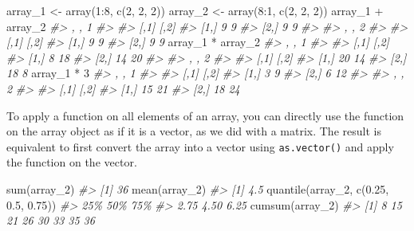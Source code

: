 \documentclass[
]{book}
\newenvironment{Shaded}{\begin{snugshade}}{\end{snugshade}}
\newcommand{\CommentTok}[1]{\textcolor[rgb]{0.56,0.35,0.01}{\textit{#1}}}
\newcommand{\DecValTok}[1]{\textcolor[rgb]{0.00,0.00,0.81}{#1}}
\newcommand{\FloatTok}[1]{\textcolor[rgb]{0.00,0.00,0.81}{#1}}
\newcommand{\FunctionTok}[1]{\textcolor[rgb]{0.00,0.00,0.00}{#1}}
\newcommand{\NormalTok}[1]{#1}
\newcommand{\OtherTok}[1]{\textcolor[rgb]{0.56,0.35,0.01}{#1}}
\newcommand{\SpecialCharTok}[1]{\textcolor[rgb]{0.00,0.00,0.00}{#1}}
\begin{document}
\begin{Shaded}
\begin{Highlighting}[]
\NormalTok{array\_1 }\OtherTok{\textless{}{-}} \FunctionTok{array}\NormalTok{(}\DecValTok{1}\SpecialCharTok{:}\DecValTok{8}\NormalTok{, }\FunctionTok{c}\NormalTok{(}\DecValTok{2}\NormalTok{, }\DecValTok{2}\NormalTok{, }\DecValTok{2}\NormalTok{))}
\NormalTok{array\_2 }\OtherTok{\textless{}{-}} \FunctionTok{array}\NormalTok{(}\DecValTok{8}\SpecialCharTok{:}\DecValTok{1}\NormalTok{, }\FunctionTok{c}\NormalTok{(}\DecValTok{2}\NormalTok{, }\DecValTok{2}\NormalTok{, }\DecValTok{2}\NormalTok{))}
\NormalTok{array\_1 }\SpecialCharTok{+}\NormalTok{ array\_2}
\CommentTok{\#\textgreater{} , , 1}
\CommentTok{\#\textgreater{} }
\CommentTok{\#\textgreater{}      [,1] [,2]}
\CommentTok{\#\textgreater{} [1,]    9    9}
\CommentTok{\#\textgreater{} [2,]    9    9}
\CommentTok{\#\textgreater{} }
\CommentTok{\#\textgreater{} , , 2}
\CommentTok{\#\textgreater{} }
\CommentTok{\#\textgreater{}      [,1] [,2]}
\CommentTok{\#\textgreater{} [1,]    9    9}
\CommentTok{\#\textgreater{} [2,]    9    9}
\NormalTok{array\_1 }\SpecialCharTok{*}\NormalTok{ array\_2}
\CommentTok{\#\textgreater{} , , 1}
\CommentTok{\#\textgreater{} }
\CommentTok{\#\textgreater{}      [,1] [,2]}
\CommentTok{\#\textgreater{} [1,]    8   18}
\CommentTok{\#\textgreater{} [2,]   14   20}
\CommentTok{\#\textgreater{} }
\CommentTok{\#\textgreater{} , , 2}
\CommentTok{\#\textgreater{} }
\CommentTok{\#\textgreater{}      [,1] [,2]}
\CommentTok{\#\textgreater{} [1,]   20   14}
\CommentTok{\#\textgreater{} [2,]   18    8}
\NormalTok{array\_1 }\SpecialCharTok{*} \DecValTok{3}
\CommentTok{\#\textgreater{} , , 1}
\CommentTok{\#\textgreater{} }
\CommentTok{\#\textgreater{}      [,1] [,2]}
\CommentTok{\#\textgreater{} [1,]    3    9}
\CommentTok{\#\textgreater{} [2,]    6   12}
\CommentTok{\#\textgreater{} }
\CommentTok{\#\textgreater{} , , 2}
\CommentTok{\#\textgreater{} }
\CommentTok{\#\textgreater{}      [,1] [,2]}
\CommentTok{\#\textgreater{} [1,]   15   21}
\CommentTok{\#\textgreater{} [2,]   18   24}
\end{Highlighting}
\end{Shaded}

To apply a function on all elements of an array, you can directly use the function on the array object as if it is a vector, as we did with a matrix. The result is equivalent to first convert the array into a vector using \texttt{as.vector()} and apply the function on the vector.

\begin{Shaded}
\begin{Highlighting}[]
\FunctionTok{sum}\NormalTok{(array\_2)}
\CommentTok{\#\textgreater{} [1] 36}
\FunctionTok{mean}\NormalTok{(array\_2)}
\CommentTok{\#\textgreater{} [1] 4.5}
\FunctionTok{quantile}\NormalTok{(array\_2, }\FunctionTok{c}\NormalTok{(}\FloatTok{0.25}\NormalTok{, }\FloatTok{0.5}\NormalTok{, }\FloatTok{0.75}\NormalTok{))}
\CommentTok{\#\textgreater{}  25\%  50\%  75\% }
\CommentTok{\#\textgreater{} 2.75 4.50 6.25}
\FunctionTok{cumsum}\NormalTok{(array\_2)}
\CommentTok{\#\textgreater{} [1]  8 15 21 26 30 33 35 36}
\end{Highlighting}
\end{Shaded}
\end{document}
